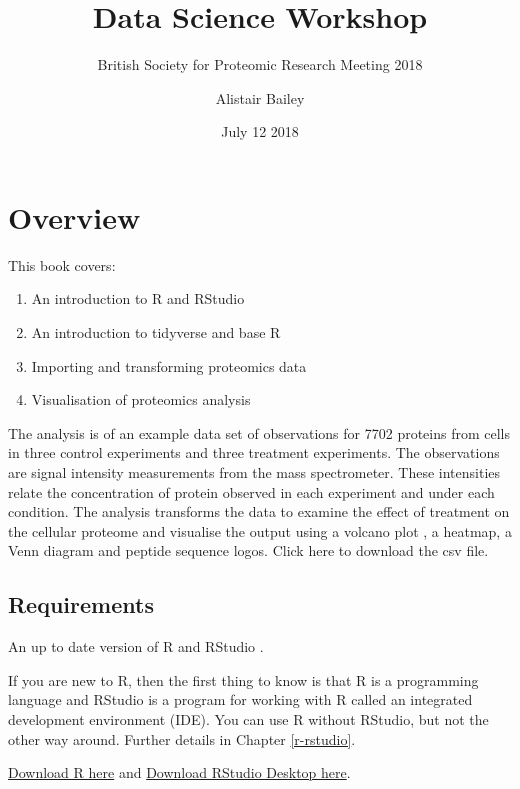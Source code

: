 \documentclass[12pt,]{book}
\title{Data Science Workshop}
\subtitle{British Society for Proteomic Research Meeting 2018}
\author{Alistair Bailey}
\date{July 12 2018}
\providecommand{\tightlist}{%
  \setlength{\itemsep}{0pt}\setlength{\parskip}{0pt}}
\theoremstyle{definition}
\theoremstyle{definition}
\theoremstyle{definition}
\theoremstyle{remark}
\begin{document}
\maketitle

{
\setcounter{tocdepth}{1}
\tableofcontents
}
\chapter*{Overview}\label{overview}

This book covers:

\begin{enumerate}
\def\labelenumi{\arabic{enumi}.}
\tightlist
\item
  An introduction to R and RStudio
\item
  An introduction to tidyverse and base R
\item
  Importing and transforming proteomics data
\item
  Visualisation of proteomics analysis
\end{enumerate}

The analysis is of an example data set of observations for 7702 proteins
from cells in three control experiments and three treatment experiments.
The observations are signal intensity measurements from the mass
spectrometer. These intensities relate the concentration of protein
observed in each experiment and under each condition. The analysis
transforms the data to examine the effect of treatment on the cellular
proteome and visualise the output using a volcano plot , a heatmap, a
Venn diagram and peptide sequence logos. Click here to download the csv
file.

\section*{Requirements}\label{requirements}

An up to date version of R \citep{R-base} and RStudio
\citep{rstudioteam2018}.

If you are new to R, then the first thing to know is that R is a
programming language and RStudio is a program for working with R called
an integrated development environment (IDE). You can use R without
RStudio, but not the other way around. Further details in Chapter
\ref{r-rstudio}.

\href{https://cran.r-project.org/}{Download R here} and
\href{https://www.rstudio.com/products/rstudio/download/}{Download
RStudio Desktop here}.
\end{document}
